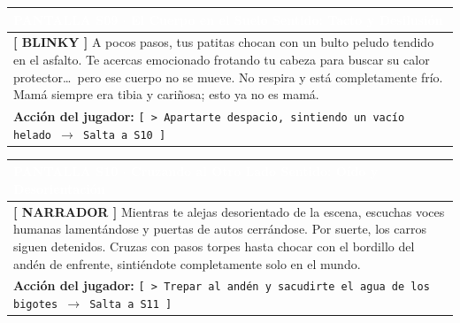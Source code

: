 \documentclass[11pt, a4paper]{article}
\begin{document}
\vspace{1em}

\noindent
\begin{tabularx}{\textwidth}{|X|}
\hline
\rowcolor{colorHeader}
\textbf{\textcolor{white}{PANTALLA S09 $\cdot$ El Cuerpo en el Suelo}} \hfill \small\textcolor{white}{Sentido: Tacto y Desilusión} \\ \hline
\rowcolor{colorTextoBox}
\textbf{\textcolor{colorEmisor}{[ BLINKY ]}} \vspace{0.2em}\newline
A pocos pasos, tus patitas chocan con un bulto peludo tendido en el asfalto. Te acercas emocionado frotando tu cabeza para buscar su calor protector\ldots\ pero ese cuerpo no se mueve. No respira y está completamente frío. Mamá siempre era tibia y cariñosa; esto ya no es mamá. \\ \hline
\rowcolor{colorBotonBox}
\textbf{Acción del jugador:} \newline
\texttt{[ > Apartarte despacio, sintiendo un vacío helado $\rightarrow$ Salta a S10 ]} \\ \hline
\end{tabularx}

\vspace{1em}

\noindent
\begin{tabularx}{\textwidth}{|X|}
\hline
\rowcolor{colorHeader}
\textbf{\textcolor{white}{PANTALLA S10 $\cdot$ Cruzando al Otro Lado}} \hfill \small\textcolor{white}{Sentido: Oído y Desorientación} \\ \hline
\rowcolor{colorTextoBox}
\textbf{\textcolor{colorEmisor}{[ NARRADOR ]}} \vspace{0.2em}\newline
Mientras te alejas desorientado de la escena, escuchas voces humanas lamentándose y puertas de autos cerrándose. Por suerte, los carros siguen detenidos. Cruzas con pasos torpes hasta chocar con el bordillo del andén de enfrente, sintiéndote completamente solo en el mundo. \\ \hline
\rowcolor{colorBotonBox}
\textbf{Acción del jugador:} \newline
\texttt{[ > Trepar al andén y sacudirte el agua de los bigotes $\rightarrow$ Salta a S11 ]} \\ \hline
\end{tabularx}

\vspace{1em}
\end{document}

